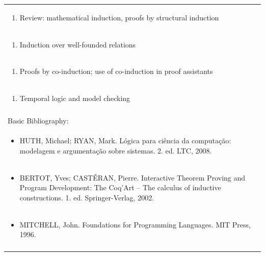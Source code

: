 \documentclass[11pt]{article}
\begin{document}
\begin{center}
\begin{longtable}{|p{4cm}|p{4cm}|p{4cm}|p{4cm}|}
\multicolumn{4}{|p{\dimexpr 16cm + 6\tabcolsep\relax}|}{\begin{enumerate}[start=10]\item Review: mathematical induction, proofs by structural induction\end{enumerate}}\\
\multicolumn{4}{|p{\dimexpr 16cm + 6\tabcolsep\relax}|}{\begin{enumerate}[start=11]\item Induction over well-founded relations\end{enumerate}}\\
\multicolumn{4}{|p{\dimexpr 16cm + 6\tabcolsep\relax}|}{\begin{enumerate}[start=12]\item Proofs by co-induction; use of co-induction in proof assistants\end{enumerate}}\\
\multicolumn{4}{|p{\dimexpr 16cm + 6\tabcolsep\relax}|}{\begin{enumerate}[start=13]\item Temporal logic and model checking\end{enumerate}}\\
\multicolumn{4}{|p{\dimexpr 16cm + 6\tabcolsep\relax}|}{}\\
\hline
\multicolumn{4}{|p{16cm}|}{Basic Bibliography:}\\*
\multicolumn{4}{|p{\dimexpr 16cm + 6\tabcolsep\relax}|}{\begin{itemize}\item HUTH, Michael; RYAN, Mark. Lógica para ciência da computação: modelagem e argumentação sobre sistemas. 2. ed. LTC, 2008.\end{itemize}}\\
\multicolumn{4}{|p{\dimexpr 16cm + 6\tabcolsep\relax}|}{\begin{itemize}\item BERTOT, Yves; CASTÉRAN, Pierre. Interactive Theorem Proving and Program Development: The Coq'Art – The calculus of inductive constructions. 1. ed. Springer-Verlag, 2002.\end{itemize}}\\
\multicolumn{4}{|p{\dimexpr 16cm + 6\tabcolsep\relax}|}{\begin{itemize}\item MITCHELL, John. Foundations for Programming Languages. MIT Press, 1996.\end{itemize}}\\
\multicolumn{4}{|p{16cm}|}{}\\

\end{longtable}
\end{center}
\end{document}
